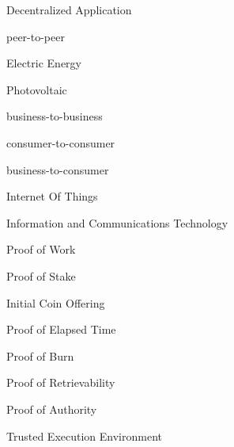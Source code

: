 {Decentralized Application}

{peer-to-peer}

{}

{}

{}

{}

{Electric Energy}

{}

{Photovoltaic}

{}

{}

{business-to-business}

{consumer-to-consumer}

{business-to-consumer}

{Internet Of Things}

{}

{Information and Communications Technology}

{Proof of Work}

{Proof of Stake}

{Initial Coin Offering}

{Proof of Elapsed Time}

{Proof of Burn}

{Proof of Retrievability}

{Proof of Authority}

{Trusted Execution Environment}

